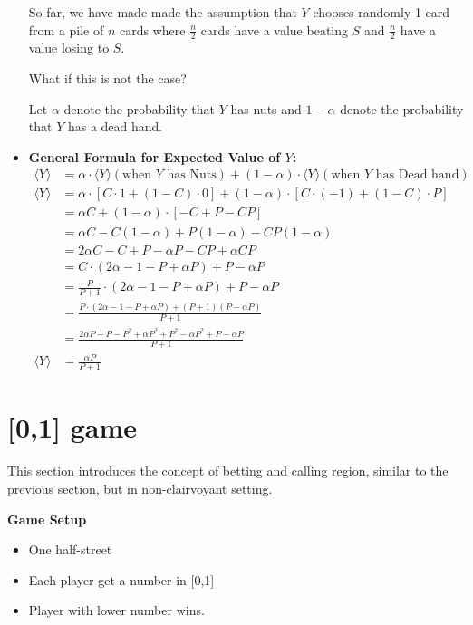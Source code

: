 \documentclass[12pt]{article}
\begin{document}
\begin{itemize}
So far, we have made made the assumption that $Y$ chooses randomly 1 card from a pile of $n$ cards where $\frac{n}{2}$ cards have a value beating $S$ and $\frac{n}{2}$ have a value losing to $S$.

What if this is not the case? 

Let $\alpha$ denote the probability that $Y$ has nuts and $1-\alpha$ denote the probability that $Y$ has a dead hand.

\item \textbf{General Formula for Expected Value of $Y$:}
    \begin{align*}
        \langle Y \rangle &= \alpha \cdot \langle Y \rangle (\text{when $Y$ has Nuts}) + (1-\alpha) \cdot \langle Y \rangle (\text{when $Y$ has Dead hand}) \\
        \langle Y \rangle &= \alpha \cdot [C \cdot 1 + (1-C)\cdot 0] + (1-\alpha) \cdot [C\cdot(-1) + (1-C)\cdot P] \\
        &= \alpha C + (1-\alpha) \cdot [-C + P - CP] \\
        &= \alpha C - C(1-\alpha) + P(1-\alpha) - CP(1-\alpha)\\
        &= 2\alpha C - C + P - \alpha P - CP + \alpha CP\\
        &= C \cdot (2\alpha - 1 - P + \alpha P) + P - \alpha P\\
        &= \frac{P}{P+1} \cdot (2\alpha - 1- P + \alpha P) + P - \alpha P \\
        &= \frac{P \cdot (2\alpha - 1 - P + \alpha P) + (P + 1)(P - \alpha P)}{P + 1} \\
        &= \frac{2\alpha P - P - P^2 + \alpha P^2 + P^2 - \alpha P^2 + P - \alpha P}{P + 1} \\
        \langle Y \rangle &= \frac{\alpha P}{P+1}
    \end{align*}

\end{itemize}

\section{[0,1] game}

\hspace{\parindent} This section introduces the concept of betting and calling region, similar to the previous section, but in non-clairvoyant setting.

\textbf{Game Setup}
\begin{itemize}
    \item One half-street
    \item Each player get a number in [0,1]
    \item Player with lower number wins.
\end{itemize}
\end{document}

